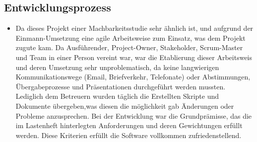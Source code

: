 \subsection{Entwicklungsprozess}
\label{sec:Entwicklungsprozess}
\begin{itemize}
	\item Da dieses Projekt einer Machbarkeitsstudie sehr ähnlich ist, und aufgrund der Einmann-Umsetzung  eine agile Arbeitsweise zum Einsatz, was dem Projekt zugute kam.
	Da Ausführender, Project-Owner, Stakeholder, Scrum-Master und Team in einer Person vereint war, war die Etablierung dieser Arbeitsweis und deren Umsetzung sehr 
	unproblematisch, da keine langwierigen Kommunikationswege (Email, Briefverkehr, Telefonate) oder Abstimmungen, Übergabeprozesse und Präsentationen durchgeführt werden mussten.
	 Lediglich dem Betreuern wurden täglich die Erstellten Skripte und Dokumente übergeben,was diesen die möglichkeit gab Änderungen oder Probleme anzusprechen.   
	Bei der Entwicklung war die Grundprämisse, das die im Lastenheft hinterlegten Anforderungen und deren Gewichtungen erfüllt werden. Diese Kriterien erfüllt die Software
	vollkommen zufriedenstellend.    	 
\end{itemize}
